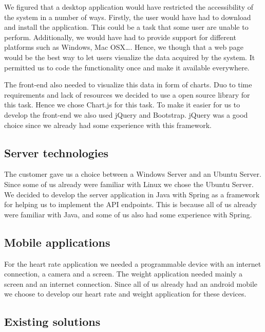 We figured that a desktop application would have restricted the accessibility
of the system in a number of ways. Firstly, the user would have had to download
and install the application. This could be a task that some user are unable to perform.
Additionally, we would have had to provide support for different platforms such as
Windows, Mac OSX\ldots.
Hence, we though that a web page would be the best way to let users visualize
the data acquired by the system. It permitted us to code the functionality
once and make it available everywhere.


The front-end also needed to visualize this data in form of charts.
Duo to time requirements and lack of resources we decided to use a open source library for this task.
Hence we chose Chart.js for this task.
To make it easier for us to develop the front-end we also used jQuery and Bootstrap.
jQuery was a good choice since we already had some experience with this framework.

\subsection{Server technologies}

The customer gave us a choice between a Windows Server and an Ubuntu Server.
Since some of us already were familiar with Linux we chose the Ubuntu Server.
We decided to develop the server application in Java with Spring as a framework for helping us to implement the API endpoints.
This is because all of us already were familiar with Java, and some of us also had some experience with Spring.

\subsection{Mobile applications}

For the heart rate application we needed a programmable device with an internet connection, a camera and a screen.
The weight application needed mainly a screen and an internet connection.
Since all of us already had an android mobile we choose to develop our heart rate and weight application for these devices.

\subsection{Existing solutions}

